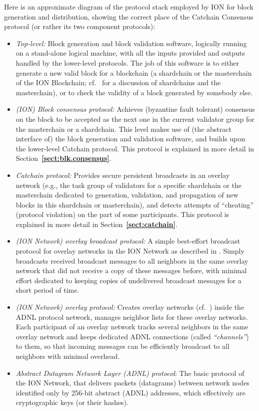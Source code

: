 \documentclass[12pt,oneside]{article}
\def\refpoint#1{{\rm\textbf{\ref{#1}}}}
\let\ptref=\refpoint
\begin{document}
Here is an approximate diagram of the protocol stack employed by ION for block generation and distribution, showing the correct place of the Catchain Consensus protocol (or rather its two component protocols):
\begin{itemize}
\item {\it Top-level:} Block generation and block validation software, logically running on a stand-alone logical machine, with all the inputs provided and outputs handled by the lower-level protocols. The job of this software is to either generate a new valid block for a blockchain (a shardchain or the masterchain of the ION Blockchain; cf.~\cite{ION} for a discussion of shardchains and the masterchain), or to check the validity of a block generated by somebody else.
\item {\it (ION) Block consensus protocol:\/} Achieves (byzantine fault tolerant) consensus on the block to be accepted as the next one in the current validator group for the masterchain or a shardchain. This level makes use of (the abstract interface of) the block generation and validation software, and builds upon the lower-level Catchain protocol. This protocol is explained in more detail in Section~\ptref{sect:blk.consensus}.
\item {\it Catchain protocol:\/} Provides secure persistent broadcasts in an overlay network (e.g., the task group of validators for a specific shardchain or the masterchain dedicated to generation, validation, and propagation of new blocks in this shardchain or masterchain), and detects attempts of ``cheating'' (protocol violation) on the part of some participants. This protocol is explained in more detail in Section~\ptref{sect:catchain}.
\item {\it (ION Network) overlay broadcast protocol:\/} A simple best-effort broadcast protocol for overlay networks in the ION Network as described in \cite{ION}. Simply broadcasts received broadcast messages to all neighbors in the same overlay network that did not receive a copy of these messages before, with minimal effort dedicated to keeping copies of undelivered broadcast messages for a short period of time.
\item {\it (ION Network) overlay protocol:\/} Creates overlay networks (cf.~\cite{ION}) inside the ADNL protocol network, manages neighbor lists for these overlay networks. Each participant of an overlay network tracks several neighbors in the same overlay network and keeps dedicated ADNL connections (called {\em ``channels''\/}) to them, so that incoming messages can be efficiently broadcast to all neighbors with minimal overhead.
\item {\it Abstract Datagram Network Layer (ADNL) protocol\/}: The basic protocol of the ION Network, that delivers packets (datagrams) between network nodes identified only by 256-bit abstract (ADNL) addresses, which effectively are cryptographic keys (or their hashes).
\end{itemize}
\end{document}
